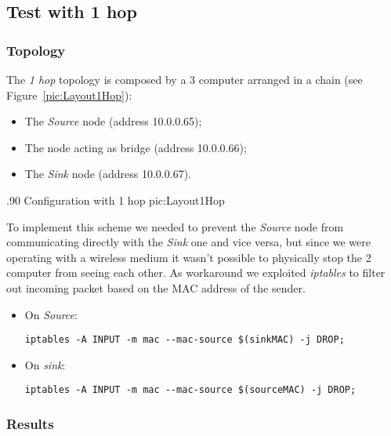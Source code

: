\subsection{Test with 1 hop}

    \subsubsection{Topology}

        The \emph{1 hop} topology is composed by a 3 computer arranged
        in a chain (see Figure~\ref{pic:Layout1Hop}):
        \begin{itemize}
        \item   The \emph{Source} node (address 10.0.0.65);
        \item   The node acting as bridge (address 10.0.0.66);
        \item   The \emph{Sink} node (address 10.0.0.67).
        \end{itemize}

                {.90\columnwidth}
                {Configuration with 1 hop}
                {pic:Layout1Hop}

        To implement this scheme we needed to prevent the \emph{Source}
        node from communicating directly with the \emph{Sink} one and vice
        versa, but since we were operating with a wireless medium it
        wasn't possible to physically stop the 2 computer from seeing each
        other. As workaround we exploited \emph{iptables} to filter out
        incoming packet based on the MAC address of the sender.

        \begin{itemize}
        \item On \emph{Source}:
            \begin{verbatim}
iptables -A INPUT -m mac --mac-source $(sinkMAC) -j DROP;
            \end{verbatim}

        \item On \emph{sink}:
            \begin{verbatim}
iptables -A INPUT -m mac --mac-source $(sourceMAC) -j DROP;
            \end{verbatim}

        \end{itemize}

    \subsubsection{Results}

